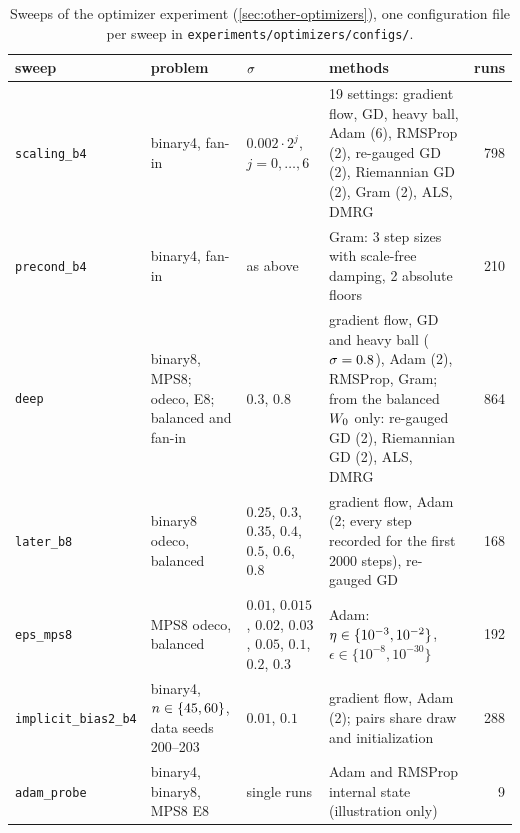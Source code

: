 \begin{table}[ht]
  \centering
  \caption{Sweeps of the optimizer experiment (\cref{sec:other-optimizers}), one configuration file
    per sweep in \texttt{experiments/optimizers/configs/}.}
  \label{tab:exp-optimizers}
  \footnotesize
  \begin{tabularx}{\textwidth}{@{}>{\raggedright\arraybackslash}p{2.9cm}
      >{\raggedright\arraybackslash}p{2.7cm}>{\raggedright\arraybackslash}p{2.5cm}X r@{}}
    \toprule
    sweep & problem & $\sigma$ & methods & runs \\
    \midrule
    \texttt{scaling\_b4} & binary4, fan-in & $0.002\cdot2^j$, $j=0,\dots,6$ & 19 settings: gradient flow,
      GD, heavy ball, Adam (6), RMSProp (2), re-gauged GD (2), Riemannian GD (2), Gram (2), ALS, DMRG
      & 798 \\
    \texttt{precond\_b4} & binary4, fan-in & as above & Gram: 3 step sizes with scale-free damping,
      2 absolute floors & 210 \\
    \texttt{deep} & binary8, MPS8; odeco, E8; balanced and fan-in & $0.3$, $0.8$ & gradient flow, GD
      and heavy ball ($\sigma=0.8$), Adam (2), RMSProp, Gram; from the balanced $W_{0}$ only: re-gauged GD
      (2), Riemannian GD (2), ALS, DMRG & 864 \\
    \texttt{later\_b8} & binary8 odeco, balanced & $0.25$, $0.3$, $0.35$, $0.4$, $0.5$, $0.6$, $0.8$ &
      gradient flow, Adam (2; every step recorded for the first 2000 steps), re-gauged GD & 168 \\
    \texttt{eps\_mps8} & MPS8 odeco, balanced & $0.01$, $0.015$, $0.02$, $0.03$, $0.05$, $0.1$,
      $0.2$, $0.3$ & Adam: $\eta\in\{10^{-3},10^{-2}\}$, $\epsilon\in\{10^{-8},10^{-30}\}$ & 192 \\
    \texttt{implicit\_bias2\_b4} & binary4, $n\in\{45,60\}$, data seeds 200--203 & $0.01$,
      $0.1$ & gradient flow, Adam (2); pairs share draw and initialization & 288 \\
    \texttt{adam\_probe} & binary4, binary8, MPS8 E8 & single runs & Adam and RMSProp internal state
      (illustration only) & 9 \\
    \bottomrule
  \end{tabularx}
\end{table}

